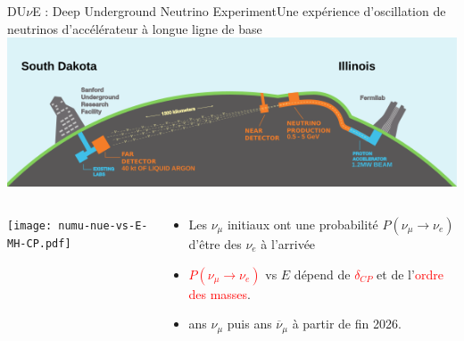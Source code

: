     \begin{frame}{DU$\nu$E : Deep Underground Neutrino Experiment}{Une expérience d'oscillation de neutrinos d'accélérateur à longue ligne de base}
        \includegraphics[width=\textwidth]{./pictures/dune.png}\\
        \begin{scriptsize}
        \vspace{0.4cm}
        \begin{columns}
            \begin{column}{0.75\textwidth}
                \texttt{[image: numu-nue-vs-E-MH-CP.pdf]}
            \end{column}
            \hspace{-0.5cm}
            \begin{column}{0.35\textwidth}
                 \begin{itemize}
                     \item Les $\nu_{\mu}$ initiaux ont une probabilité $P(\nu_{\mu}\to\nu_e)$ d'être des $\nu_e$ à l'arrivée
                     \item \textcolor{red}{$P(\nu_{\mu}\to\nu_e)$} vs $E$ dépend de \textcolor{red}{$\delta_{CP}$} et de l'\textcolor{red}{ordre des masses}.
                     \item {} ans $\nu_{\mu}$ puis  ans $\overline{\nu}_{\mu}$ à partir de fin 2026.
                 \end{itemize}
            \end{column}
        \end{columns}

\end{scriptsize}
\end{frame}

